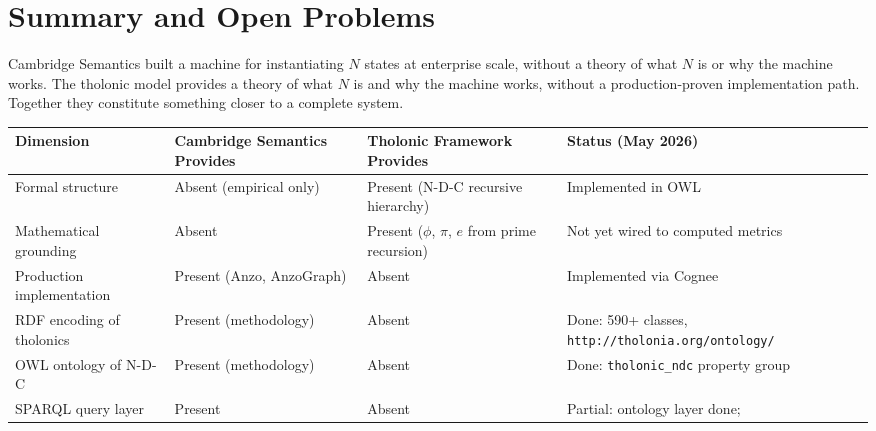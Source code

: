 \documentclass[12pt]{article}
\begin{document}
\section{Summary and Open Problems}\label{summary-and-open-problems}

Cambridge Semantics built a machine for instantiating \(N\) states at
enterprise scale, without a theory of what \(N\) is or why the machine
works. The tholonic model provides a theory of what \(N\) is and why the
machine works, without a production-proven implementation path. Together
they constitute something closer to a complete system.

\begin{longtable}[]{@{}
  >{\raggedright\arraybackslash}p{}
  >{\raggedright\arraybackslash}p{}
  >{\raggedright\arraybackslash}p{}
  >{\raggedright\arraybackslash}p{}@{}}
\toprule\noalign{}
\begin{minipage}[b]{\linewidth}\raggedright
Dimension
\end{minipage} & \begin{minipage}[b]{\linewidth}\raggedright
Cambridge Semantics Provides
\end{minipage} & \begin{minipage}[b]{\linewidth}\raggedright
Tholonic Framework Provides
\end{minipage} & \begin{minipage}[b]{\linewidth}\raggedright
Status (May 2026)
\end{minipage} \\
\midrule\noalign{}
\endhead
\bottomrule\noalign{}
\endlastfoot
Formal structure & Absent (empirical only) & Present (N-D-C recursive
hierarchy) & Implemented in OWL \\
Mathematical grounding & Absent & Present (\(\phi\), \(\pi\), \(e\) from
prime recursion) & Not yet wired to computed metrics \\
Production implementation & Present (Anzo, AnzoGraph) & Absent &
Implemented via Cognee \\
RDF encoding of tholonics & Present (methodology) & Absent & Done: 590+
classes, \texttt{http://tholonia.org/ontology/} \\
OWL ontology of N-D-C & Present (methodology) & Absent & Done:
\texttt{tholonic\_ndc} property group \\
SPARQL query layer & Present & Absent & Partial: ontology layer done;

\end{longtable}
\end{document}
